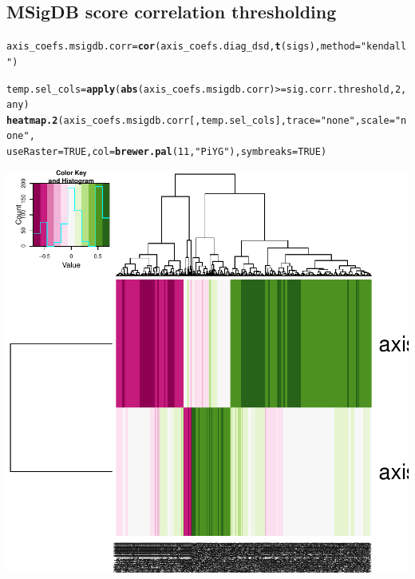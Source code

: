 \documentclass{article}\usepackage[]{graphicx}\usepackage[]{color}
\makeatletter
\def\maxwidth{ %
  \ifdim\Gin@nat@width>\linewidth
    \linewidth
  \else
    \Gin@nat@width
  \fi
}
\newcommand{\hlnum}[1]{\textcolor[rgb]{0.686,0.059,0.569}{#1}}%
\newcommand{\hlstr}[1]{\textcolor[rgb]{0.192,0.494,0.8}{#1}}%
\newcommand{\hlopt}[1]{\textcolor[rgb]{0,0,0}{#1}}%
\newcommand{\hlstd}[1]{\textcolor[rgb]{0.345,0.345,0.345}{#1}}%
\newcommand{\hlkwb}[1]{\textcolor[rgb]{0.69,0.353,0.396}{#1}}%
\newcommand{\hlkwc}[1]{\textcolor[rgb]{0.333,0.667,0.333}{#1}}%
\newcommand{\hlkwd}[1]{\textcolor[rgb]{0.737,0.353,0.396}{\textbf{#1}}}%
\newenvironment{kframe}{%
 \def\at@end@of@kframe{}%
 \ifinner\ifhmode%
  \def\at@end@of@kframe{\end{minipage}}%
  \begin{minipage}{\columnwidth}%
 \fi\fi%
 \def\FrameCommand##1{\hskip\@totalleftmargin \hskip-\fboxsep
 \colorbox{shadecolor}{##1}\hskip-\fboxsep
     \hskip-\linewidth \hskip-\@totalleftmargin \hskip\columnwidth}%
 \MakeFramed {\advance\hsize-\width
   \@totalleftmargin\z@ \linewidth\hsize
   \@setminipage}}%
 {\par\unskip\endMakeFramed%
 \at@end@of@kframe}
\newenvironment{knitrout}{}{} %
\makeatother
\begin{document}
\subsection{MSigDB score correlation thresholding}
\begin{knitrout}
\color{fgcolor}\begin{kframe}
\begin{alltt}
\hlstd{axis_coefs.msigdb.corr} \hlkwb{=} \hlkwd{cor}\hlstd{(axis_coefs.diag_dsd,} \hlkwd{t}\hlstd{(sigs),} \hlkwc{method} \hlstd{=} \hlstr{"kendall"}\hlstd{)}

\hlstd{temp.sel_cols} \hlkwb{=} \hlkwd{apply}\hlstd{(}\hlkwd{abs}\hlstd{(axis_coefs.msigdb.corr)} \hlopt{>=} \hlstd{sig.corr.threshold,} \hlnum{2}\hlstd{,}
    \hlstd{any)}
\hlkwd{heatmap.2}\hlstd{(axis_coefs.msigdb.corr[, temp.sel_cols],} \hlkwc{trace} \hlstd{=} \hlstr{"none"}\hlstd{,} \hlkwc{scale} \hlstd{=} \hlstr{"none"}\hlstd{,}
    \hlkwc{useRaster} \hlstd{=} \hlnum{TRUE}\hlstd{,} \hlkwc{col} \hlstd{=} \hlkwd{brewer.pal}\hlstd{(}\hlnum{11}\hlstd{,} \hlstr{"PiYG"}\hlstd{),} \hlkwc{symbreaks} \hlstd{=} \hlnum{TRUE}\hlstd{)}
\end{alltt}
\end{kframe}

{\centering \includegraphics[width=\maxwidth]{figure/nmf-msigdb-cor-plots-1} 

}
\end{knitrout}
\end{document}
